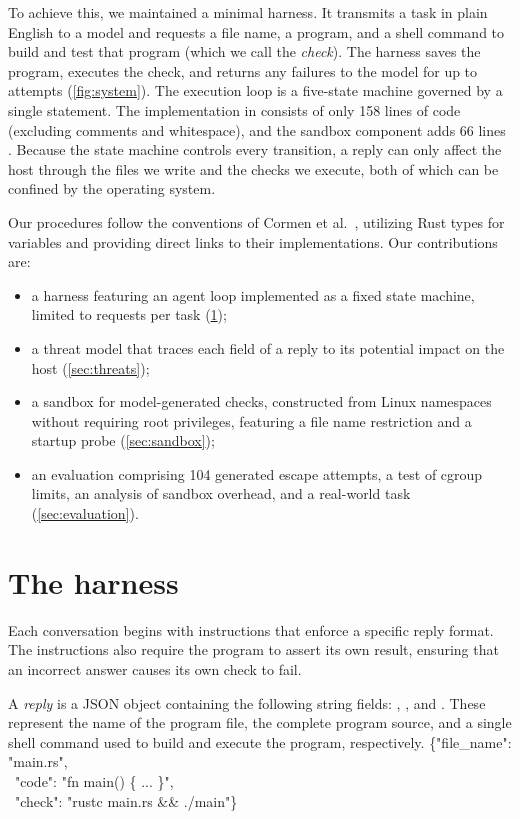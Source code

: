 \documentclass[10pt,twocolumn,a4paper]{article}
\begin{document}
To achieve this, we maintained a minimal harness. It transmits a task in plain English to a model and requests a file name, a program, and a shell command to build and test that program (which we call the \emph{check}). The harness saves the program, executes the check, and returns any failures to the model for up to  attempts (\cref{fig:system}). The execution loop is a five-state machine governed by a single  statement. The implementation in  consists of only 158 lines of code (excluding comments and whitespace), and the sandbox component adds 66 lines \cite{repo}. Because the state machine controls every transition, a reply can only affect the host through the files we write and the checks we execute, both of which can be confined by the operating system.



Our procedures follow the conventions of Cormen et al.\ \cite{cormen2022introduction}, utilizing Rust types for variables and providing direct links to their implementations. Our contributions are:
\begin{itemize}[nosep,leftmargin=*]
  \item a harness featuring an agent loop implemented as a fixed state machine, limited to  requests per task (\cref{sec:harness});
  \item a threat model that traces each field of a reply to its potential impact on the host (\cref{sec:threats});
  \item a sandbox for model-generated checks, constructed from Linux namespaces without requiring root privileges, featuring a file name restriction and a startup probe (\cref{sec:sandbox});
  \item an evaluation comprising 104 generated escape attempts, a test of cgroup limits, an analysis of sandbox overhead, and a real-world task (\cref{sec:evaluation}).
\end{itemize}

\section{The harness}
\label{sec:harness}

Each conversation begins with instructions that enforce a specific reply format. The instructions also require the program to assert its own result, ensuring that an incorrect answer causes its own check to fail.

\begin{definition}[Reply]\label{def:reply}
A \emph{reply} is a JSON object containing the following string fields: , , and . These represent the name of the program file, the complete program source, and a single shell command used to build and execute the program, respectively.
\example
{\small\ttfamily
\{"file\_name": {\color{synstring}"main.rs"},\\
\ "code": {\color{synstring}"fn main() \{ ... \}"},\\
\ "check": {\color{synstring}"rustc main.rs \&\& ./main"}\}}
\end{definition}
\end{document}
